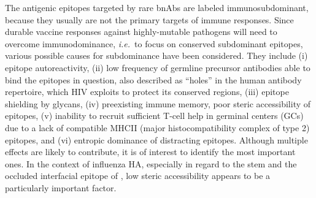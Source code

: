 \documentclass[utf8]{frontiersHLTH}%
\newcommand{\cred}[1]{\textsf{\color{red}#1}}
\def\ie {{\it i.e.}}
\begin{document}
The antigenic epitopes targeted by rare bnAbs are labeled immunosubdominant, because
they usually are not the primary targets of immune responses.
Since durable vaccine responses against highly-mutable pathogens will need
to overcome immunodominance, \ie~to focus on conserved subdominant epitopes,
various possible causes for subdominance have been considered. They include
(i) epitope autoreactivity,\cite{bajic19a} (ii) low frequency of \cred{germline} precursor
antibodies able to bind the epitopes in question,\cite{andrews15}
\cred{also described as ``holes'' in the human antibody repertoire, which HIV exploits to protect its conserved regions\cite{xiao09},}
(iii) epitope shielding by glycans,\cite{bajic19} (iv) preexisting immune
memory,\cite{andrews15,arevalo20} poor steric accessibility of
epitopes\cite{amitai20}, (v) inability to recruit sufficient T-cell help
in germinal centers (GCs) due to a lack of compatible MHCII (major histocompatibility complex of type 2) epitopes,\cite{tan19}
and (vi) entropic dominance of distracting epitopes.\cite{wang17,amitai20,glanville20}
Although multiple effects are likely to contribute, it
is of interest to identify the most important ones. In the
context of influenza HA, especially in regard to the stem and the occluded
interfacial epitope of \citet{watanabe19}, low steric accessibility appears
to be a particularly important factor.
\end{document}
